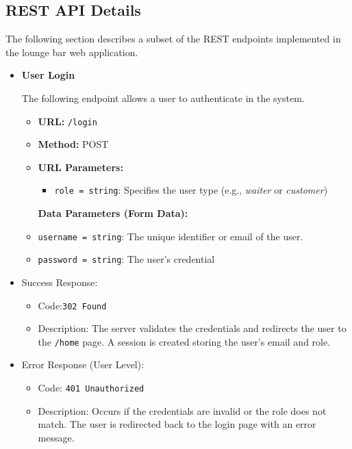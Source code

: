\documentclass[a4paper]{article}
\begin{document}
\subsection{REST API Details}

The following section describes a subset of the REST endpoints
implemented in the lounge bar web application. 

\begin{itemize}

    \item \textbf{User Login}

    The following endpoint allows a user to authenticate in the system.

\begin{itemize}
\item
  \textbf{URL:} \texttt{/login}
\item
  \textbf{Method:} POST
\item
  \textbf{URL Parameters:}\\
  \begin{itemize}
        \item \texttt{role = {string}}: Specifies the user type (e.g., \textit{waiter} or \textit{customer})
    \end{itemize}
  \textbf{Data Parameters (Form Data):}
\end{itemize}
\begin{itemize}
\item \texttt{username = {string}}: The unique identifier or email of the user.
\item \texttt{password = {string}}: The user's credential
\end{itemize}
    
    \item Success Response:
\begin{itemize}
    \item{Code}:\texttt{302 Found}
    \item{Description}: The server validates the credentials and redirects the user to the \texttt{/home} page. A session is created storing the user's email and role.
\end{itemize}

\item Error Response (User Level):
\begin{itemize}
    \item{Code}: \texttt{401 Unauthorized}
    \item{Description}: Occurs if the credentials are invalid or the role does not match. The user is redirected back to the login page with an error message.
\end{itemize}


\end{itemize}
\end{document}

